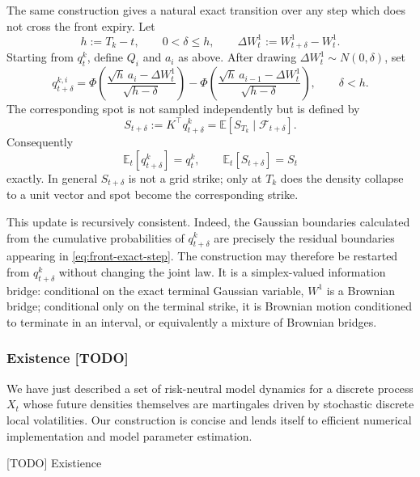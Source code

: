 \documentclass[11pt]{article}
\theoremstyle{plain}
\theoremstyle{definition}
\theoremstyle{remark}
\begin{document}
{  The same construction gives a natural exact transition over any step which
  does not cross the front expiry. Let
  \[
    h:=T_k-t,
    \qquad 0<\delta\leq h,
    \qquad \Delta W_t^1:=W_{t+\delta}^1-W_t^1.
  \]
  Starting from $q_t^k$, define $Q_i$ and $a_i$ as above. After drawing
  $\Delta W_t^1\sim N(0,\delta)$, set
  \begin{equation}
    \label{eq:front-exact-step}
    q_{t+\delta}^{k,i}
      =\Phi\!\left(
          \frac{\sqrt h\,a_i-\Delta W_t^1}{\sqrt{h-\delta}}
        \right)
       -\Phi\!\left(
          \frac{\sqrt h\,a_{i-1}-\Delta W_t^1}{\sqrt{h-\delta}}
        \right),
    \qquad \delta<h.
  \end{equation}
  The corresponding spot is not sampled independently but is defined by
  \begin{equation}
    \label{eq:spot-exact-step}
    S_{t+\delta}:=K^\top q_{t+\delta}^k
      =\mathbb E\!\left[S_{T_k}\mid\mathcal F_{t+\delta}\right].
  \end{equation}
  Consequently
  \[
    \mathbb E_t[q_{t+\delta}^k]=q_t^k,
    \qquad
    \mathbb E_t[S_{t+\delta}]=S_t
  \]
  exactly. In general $S_{t+\delta}$ is not a grid strike; only at $T_k$ does
  the density collapse to a unit vector and spot become the corresponding
  strike.

  This update is recursively consistent. Indeed, the Gaussian boundaries
  calculated from the cumulative probabilities of $q_{t+\delta}^k$ are
  precisely the residual boundaries appearing in
  \eqref{eq:front-exact-step}. The construction may therefore be restarted
  from $q_{t+\delta}^k$ without changing the joint law. It is a
  simplex-valued information bridge: conditional on the exact terminal
  Gaussian variable, $W^1$ is a Brownian bridge; conditional only on the
  terminal strike, it is Brownian motion conditioned to terminate in an
  interval, or equivalently a mixture of Brownian bridges.

\subsubsection{Existence [TODO]}

We have just described a set of risk-neutral model dynamics for a discrete process $X_t$ whose future densities themselves are martingales driven
by stochastic discrete local volatilities. Our construction is concise and lends itself to efficient numerical implementation and model parameter
estimation. 

[TODO] Existience


}
\end{document}
